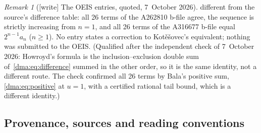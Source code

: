 \documentclass[11pt,letterpaper]{article}
\theoremstyle{remark}\newtheorem{remark}[theorem]{Remark}
\begin{document}
\begin{remark}[{[write]} The OEIS entries, quoted, 7~October 2026]
different from the source's difference table: all 26 terms of the A262810
b-file agree, the sequence is strictly increasing from $n=1$, and all 26
terms of the A316677 b-file equal $2^{n-1}a_n$ ($n\ge1$). No entry states a
correction to Kot\v{e}\v{s}ovec's equivalent; nothing was submitted to the
OEIS. \textup{(Qualified after the independent check of 7~October 2026:
Howroyd's formula is the inclusion--exclusion double sum
of~\eqref{dma:eq:difference} summed in the other order, so it is the same
identity, not a different route. The check confirmed all 26 terms by
Bala's positive sum, \eqref{dma:eq:positive} at $u=1$, with a certified
rational tail bound, which is a different identity.)}
\end{remark}

\subsection{Provenance, sources and reading conventions}\label{dma:sec:provenance}
\end{document}
